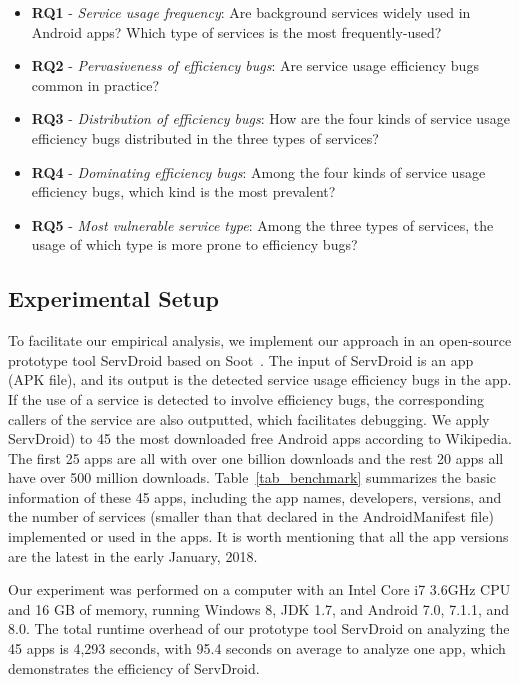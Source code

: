 \documentclass[sigconf,review, anonymous]{acmart}
\begin{document}
\begin{itemize}
\item {\bf RQ1} - {\it Service usage frequency}: Are background services widely used in Android apps? Which type of services is the most frequently-used?
\item {\bf RQ2} - {\it Pervasiveness of efficiency bugs}: Are service usage efficiency bugs common in practice?
\item {\bf RQ3} - {\it Distribution of efficiency bugs}: How are the four kinds of service usage efficiency bugs distributed in the three types of services? 
\item {\bf RQ4} - {\it Dominating efficiency bugs}: Among the four kinds of service usage efficiency bugs, which kind is the most prevalent? 
\item {\bf RQ5} - {\it Most vulnerable service type}: Among the three types of services, the usage of which type is more prone to efficiency bugs? 
\end{itemize}

\subsection{Experimental Setup}

To facilitate our empirical analysis, we implement our approach in an open-source prototype tool {\sf ServDroid} based on {\sf Soot}~\cite{sootpaper}. The input of {\sf ServDroid} is an app (APK file), and its output is the detected service usage efficiency bugs in the app. If the use of a service is detected to involve efficiency bugs, the corresponding callers of the service are also outputted, which facilitates debugging. We apply {\sf ServDroid}) to 45 the most downloaded free Android apps according to Wikipedia. The first 25 apps are all with over one billion downloads and the rest 20 apps all have over 500 million downloads. Table~\ref{tab_benchmark} summarizes the basic information of these 45 apps, including the app names, developers, versions, and the number of services (smaller than that declared in the AndroidManifest file) implemented or used in the apps. It is worth mentioning that all the app versions are the latest in the early January, 2018. 

Our experiment was performed on a computer with an Intel Core i7 3.6GHz CPU and 16 GB of memory, running Windows 8, JDK 1.7, and Android 7.0, 7.1.1, and 8.0.  The total runtime overhead of our prototype tool {\sf ServDroid} on analyzing the 45 apps is 4,293 seconds, with 95.4 seconds on average to analyze one app, which demonstrates the efficiency of {\sf ServDroid}.
\end{document}
